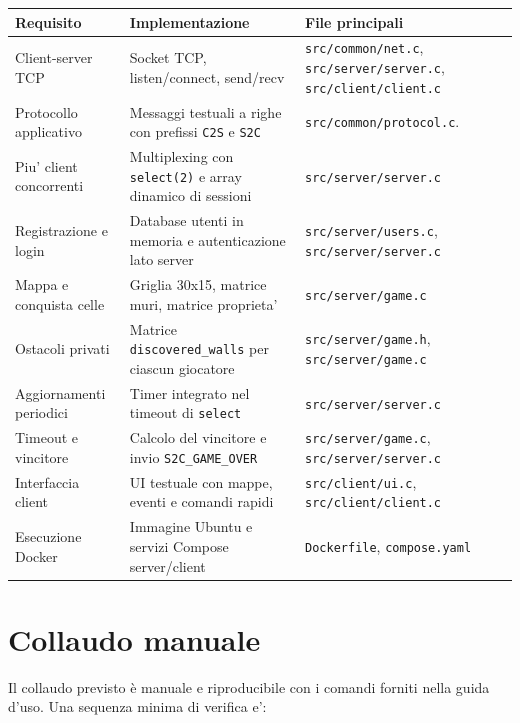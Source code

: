 \documentclass[11pt,a4paper]{article}
\begin{document}
\begin{longtable}{p{} p{} p{}}
\toprule
\textbf{Requisito} & \textbf{Implementazione} & \textbf{File principali} \\
\midrule
\endhead
Client-server TCP & Socket TCP, listen/connect, send/recv & \texttt{src/common/net.c}, \texttt{src/server/server.c}, \texttt{src/client/client.c} \\
Protocollo applicativo & Messaggi testuali a righe con prefissi \texttt{C2S} e \texttt{S2C} & \texttt{src/common/protocol.c}. \\
Piu' client concorrenti & Multiplexing con \texttt{select(2)} e array dinamico di sessioni & \texttt{src/server/server.c} \\
Registrazione e login & Database utenti in memoria e autenticazione lato server & \texttt{src/server/users.c}, \texttt{src/server/server.c} \\
Mappa e conquista celle & Griglia 30x15, matrice muri, matrice proprieta' & \texttt{src/server/game.c} \\
Ostacoli privati & Matrice \texttt{discovered\_walls} per ciascun giocatore & \texttt{src/server/game.h}, \texttt{src/server/game.c} \\
Aggiornamenti periodici & Timer integrato nel timeout di \texttt{select} & \texttt{src/server/server.c} \\
Timeout e vincitore & Calcolo del vincitore e invio \texttt{S2C\_GAME\_OVER} & \texttt{src/server/game.c}, \texttt{src/server/server.c} \\
Interfaccia client & UI testuale con mappe, eventi e comandi rapidi & \texttt{src/client/ui.c}, \texttt{src/client/client.c} \\
Esecuzione Docker & Immagine Ubuntu e servizi Compose server/client & \texttt{Dockerfile}, \texttt{compose.yaml} \\
\bottomrule
\end{longtable}

\section{Collaudo manuale}

Il collaudo previsto è manuale e riproducibile con i comandi forniti nella guida d'uso. Una sequenza minima di verifica e':
\end{document}
